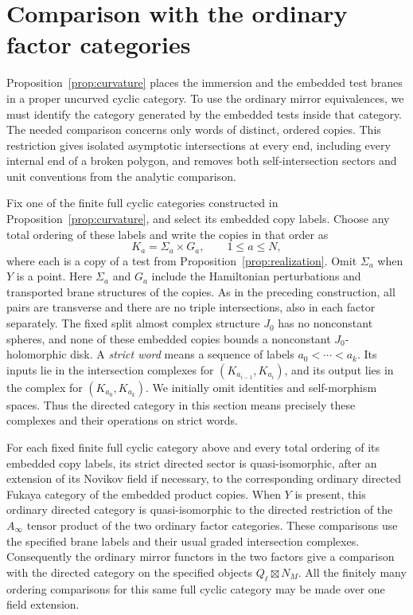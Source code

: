 \section{Comparison with the ordinary factor categories}
\label{sec:comparison}

Proposition~\ref{prop:curvature} places the immersion and the embedded
test branes in a proper uncurved cyclic category.  To use the ordinary
mirror equivalences, we must identify the category generated by the
embedded tests inside that category.  The needed comparison concerns
only words of distinct, ordered copies.  This restriction gives isolated
asymptotic intersections at every end, including every internal end of a
broken polygon, and removes both self-intersection sectors and unit
conventions from the analytic comparison.

Fix one of the finite full cyclic categories constructed in
Proposition~\ref{prop:curvature}, and select its embedded copy labels.
Choose any total ordering of these labels and write the copies in that
order as
\[
 K_a=\Sigma_a\times G_a,\qquad 1\leq a\leq N,
\]
where each is a copy of a test from Proposition~\ref{prop:realization}.
Omit $\Sigma_a$ when $Y$ is a point.  Here $\Sigma_a$ and $G_a$ include the Hamiltonian
perturbations and transported brane structures of the copies.  As in
the preceding construction, all pairs are transverse and there are no
triple intersections, also in each factor separately.  The fixed split
almost complex structure $J_0$ has no nonconstant spheres, and none of
these embedded copies bounds a nonconstant $J_0$-holomorphic disk.
A \emph{strict word} means a sequence of labels
$a_0<\cdots<a_k$.  Its inputs lie in the intersection complexes for
$(K_{a_{i-1}},K_{a_i})$, and its output lies in the complex for
$(K_{a_0},K_{a_k})$.  We initially omit identities and self-morphism
spaces.  Thus the directed category in this section means precisely
these complexes and their operations on strict words.

\begin{proposition}
\label{prop:directed-comparison}\label{prop:comparison}
For each fixed finite full cyclic category above and every total
ordering of its embedded copy labels, its strict directed sector is
quasi-isomorphic, after
an extension of its Novikov field if necessary, to the corresponding
ordinary directed Fukaya category of the embedded product copies.
When $Y$ is present, this ordinary directed category is
quasi-isomorphic to the directed restriction of the $A_\infty$ tensor
product of the two ordinary factor categories.  These comparisons use
the specified brane labels and their usual graded intersection
complexes.  Consequently the ordinary mirror functors in the two
factors give a comparison with the directed category on the specified
objects $Q_\ell\boxtimes N_M$.
All the finitely many ordering comparisons for this same full cyclic
category may be made over one field extension.
\end{proposition}


